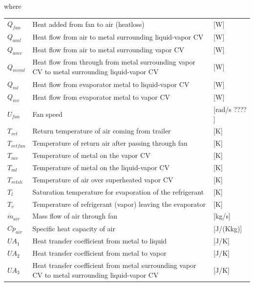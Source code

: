 where

\begin{center}
	\begin{tabular}{l p{10cm} l}
		$Q_{fan}$			& Heat added from fan to air (heatloss)			& [\si{W}] \\	
		$Q_{aml}$			& Heat flow from air to metal surrounding liquid-vapor CV			& [\si{W}] \\	
		$Q_{amv}$			& Heat flow from air to metal surrounding vapor CV			& [\si{W}] \\		
		$Q_{mvml}$			& Heat flow from through from metal surrounding vapor CV to metal surrounding liquid-vapor CV			& [\si{W}] \\	
		$Q_{ml}$			& Heat flow from evaporator metal to liquid-vapor CV			& [\si{W}] \\	
		$Q_{mv}$			& Heat flow from evaporator metal to vapor CV					& [\si{W}] \\			
		$U_{fan}$			& Fan speed 	& [rad/s ???? ]\\
		$T_{ret}$			& Return temperature of air coming from trailer 			& [\si{K}] \\		
		$T_{retfan}$		& Temperature of return air after passing through fan			& [\si{K}] \\		
		$T_{mv}$			& Temperature of metal on the vapor CV			& [\si{K}] \\
		$T_{ml}$			& Temperature of metal on the liquid-vapor CV			& [\si{K}] \\
		$T_{retsh}$			& Temperature of air over superheated vapor CV			& [\si{K}] \\
		$T_{l}$				& Saturation temperature for evaporation of the refrigerant			& [\si{K}] \\	
		$T_{v}$				& Temperature of refrigerant (vapor) leaving the evaporator		& [\si{K}] \\		
		$\dot{m}_{air}$		& Mass flow of air through fan			& [\si{kg}/\si{s}] \\		
		$Cp_{air}$			& Specific heat capacity of air			& [\si{J}/(\si{K}\si{kg})] \\	
		$UA_1$				& Heat transfer coefficient from metal to liquid			& [\si{J}/\si{K}] \\
		$UA_2$				& Heat transfer coefficient from metal to vapor			& [\si{J}/\si{K}] \\
		$UA_3$				& Heat transfer coefficient from metal surrounding vapor CV to metal surrounding liquid-vapor CV			& [\si{J}/\si{K}] \\
	\end{tabular}
\end{center}

